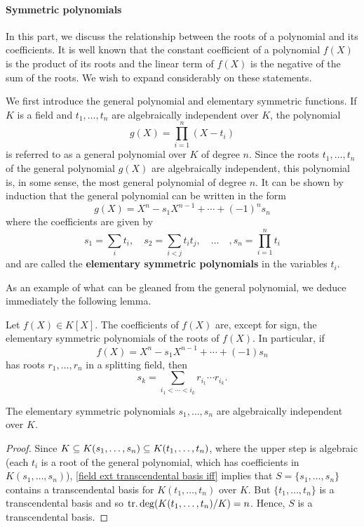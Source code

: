 \paragraph{Symmetric polynomials}
In this part, we discuss the relationship between the roots of a polynomial and its coefficients. It is well known that the constant coefficient of a polynomial $f(X)$ is the product of its roots and the linear term of $f(X)$ is the negative of the sum of the roots. We wish to expand considerably on these statements.\par
We first introduce the general polynomial and elementary symmetric functions. If $K$ is a field and $t_1,\dots,t_n$ are algebraically independent over $K$, the polynomial
\[g(X)=\prod_{i=1}^{n}(X-t_i)\]
is referred to as a general polynomial over $K$ of degree $n$. Since the roots $t_1,\dots,t_n$ of the general polynomial $g(X)$ are algebraically independent, this polynomial is, in some sense, the most general polynomial of degree $n$. It can be shown by induction that the general polynomial can be written in the form
\[g(X)=X^n-s_1X^{n-1}+\cdots+(-1)^ns_n\]
where the coefficients are given by
\[s_1=\sum_it_i,\quad s_2=\sum_{i<j}t_it_j,\quad\dots\quad,s_n=\prod_{i=1}^{n}t_i\]
and are called the \textbf{elementary symmetric polynomials} in the variables $t_i$.\par
As an example of what can be gleaned from the general polynomial, we deduce immediately the following lemma.
\begin{lemma}\label{polynomial coefficient in roots}
Let $f(X)\in K[X]$. The coefficients of $f(X)$ are, except for sign, the elementary symmetric polynomials of the roots of $f(X)$. In particular, if
\[f(X)=X^n-s_1X^{n-1}+\cdots+(-1)s_n\]
has roots $r_1,\dots,r_n$ in a splitting field, then
\[s_k=\sum_{i_1<\cdots<i_k}r_{i_1}\cdots r_{i_k}.\]
\end{lemma}
\begin{proposition}
The elementary symmetric polynomials $s_1,\dots,s_n$ are algebraically independent over $K$.
\end{proposition}
\begin{proof}
Since $K\subseteq K(s_1,\dots,s_n)\subseteq K(t_1,\dots,t_n)$, where the upper step is algebraic (each $t_i$ is a root of the general polynomial, which has coefficients in $K(s_1,\dots,s_n)$), \cref{field ext transcendental basis iff} implies that $S=\{s_1,\dots,s_n\}$ contains a transcendental basis for $K(t_1,\dots,t_n)$ over $K$. But $\{t_1,\dots,t_n\}$ is a transcendental basis and so $\mathrm{tr}.\deg(K(t_1,\dots,t_n)/K)=n$. Hence, $S$ is a transcendental basis.
\end{proof}
